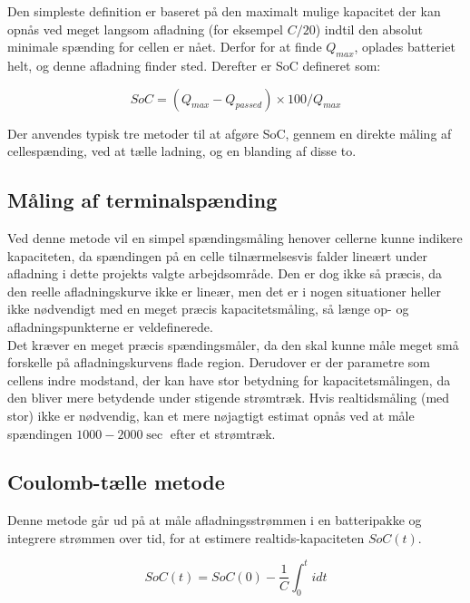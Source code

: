 Den simpleste definition er baseret på den maximalt mulige kapacitet der kan opnås ved meget langsom afladning (for eksempel $C/20$) indtil den absolut minimale spænding for cellen er nået. Derfor for at finde $Q_{max}$, oplades batteriet helt, og denne afladning finder sted. Derefter er SoC defineret som: 

\begin {equation} 
SoC = (Q_{max}-Q_{passed})\times 100/Q_{max} \label{eq:soc}
\end {equation}

Der anvendes typisk tre metoder til at afgøre SoC, gennem en direkte måling af cellespænding, ved at tælle ladning, og en blanding af disse to.

\subsection{Måling af terminalspænding}
Ved denne metode vil en simpel spændingsmåling henover cellerne kunne indikere kapaciteten, da spændingen på en celle tilnærmelsesvis falder lineært under afladning i dette projekts valgte arbejdsområde. Den er dog ikke så præcis, da den reelle afladningskurve ikke er lineær, men det er i nogen situationer heller ikke nødvendigt med en meget præcis kapacitetsmåling, så længe op- og afladningspunkterne er veldefinerede.
\\

Det kræver en meget præcis spændingsmåler, da den skal kunne måle meget små forskelle på afladningskurvens flade region. Derudover er der parametre som cellens indre modstand, der kan have stor betydning for kapacitetsmålingen, da den bliver mere betydende under stigende strømtræk. Hvis realtidsmåling (med stor) ikke er nødvendig, kan et mere nøjagtigt estimat opnås ved at måle spændingen $1000 - 2000 \sec$ efter et strømtræk.


\subsection{Coulomb-tælle metode}
Denne metode går ud på at måle afladningsstrømmen i en batteripakke og integrere strømmen over tid, for at estimere realtids-kapaciteten $SoC(t)$. 

\begin {equation} 
SoC(t) = SoC(0) - \frac{1}{C} \int_{0}^{t} idt  \label{eq:coulomb-count}
\end {equation}

